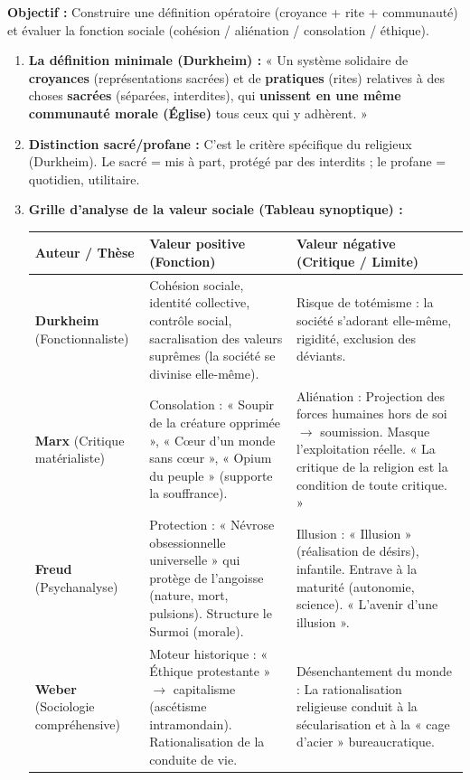 \documentclass[11pt]{article}
\newcommand{\cle}[1]{{\popxbold\color{popdark}#1}}
\begin{document}
\begin{methode}
\textbf{Objectif :} Construire une définition opératoire (croyance + rite + communauté) et évaluer la fonction sociale (cohésion / aliénation / consolation / éthique).
\begin{enumerate}
    \item \textbf{La définition minimale (Durkheim) :} « Un système solidaire de \textbf{croyances} (représentations sacrées) et de \textbf{pratiques} (rites) relatives à des choses \textbf{sacrées} (séparées, interdites), qui \textbf{unissent en une même communauté morale (Église)} tous ceux qui y adhèrent. »
    \item \textbf{Distinction sacré/profane :} C'est le \cle{critère spécifique} du religieux (Durkheim). Le sacré = mis à part, protégé par des interdits ; le profane = quotidien, utilitaire.
    \item \textbf{Grille d'analyse de la valeur sociale (Tableau synoptique) :}
    \begin{center}
    \begin{tabularx}{\linewidth}{|l|X|X|}\hline
    \textbf{Auteur / Thèse} & \textbf{Valeur positive (Fonction)} & \textbf{Valeur négative (Critique / Limite)} \\ \hline
    \textbf{Durkheim} (Fonctionnaliste) & \cle{Cohésion sociale}, identité collective, contrôle social, sacralisation des valeurs suprêmes (la société se divinise elle-même). & Risque de \cle{totémisme} : la société s'adorant elle-même, rigidité, exclusion des déviants. \\ \hline
    \textbf{Marx} (Critique matérialiste) & \cle{Consolation} : « Soupir de la créature opprimée », « Cœur d'un monde sans cœur », « Opium du peuple » (supporte la souffrance). & \cle{Aliénation} : Projection des forces humaines hors de soi $\rightarrow$ soumission. Masque l'exploitation réelle. « La critique de la religion est la condition de toute critique. » \\ \hline
    \textbf{Freud} (Psychanalyse) & \cle{Protection} : « Névrose obsessionnelle universelle » qui protège de l'angoisse (nature, mort, pulsions). Structure le Surmoi (morale). & \cle{Illusion} : « Illusion » (réalisation de désirs), infantile. Entrave à la maturité (autonomie, science). « L'avenir d'une illusion ». \\ \hline
    \textbf{Weber} (Sociologie compréhensive) & \cle{Moteur historique} : « Éthique protestante » $\rightarrow$ capitalisme (ascétisme intramondain). Rationalisation de la conduite de vie. & \cle{Désenchantement du monde} : La rationalisation religieuse conduit à la sécularisation et à la « cage d'acier » bureaucratique. \\ \hline

\end{tabularx}
\end{center}
\end{enumerate}
\end{methode}
\end{document}
